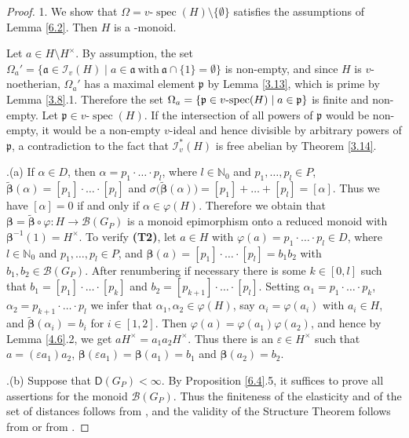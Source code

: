 \documentclass[a4paper]{amsart}
\theoremstyle{definition}
\numberwithin{equation}{section}
\begin{document}
\begin{proof}
1. We show that $\Omega = v$-$\operatorname{spec} (H) \setminus \{\emptyset\}$
satisfies the assumptions of Lemma \ref{6.2}. Then $H$ is a
{}-monoid.

Let $a \in H \setminus H^{\times}$. By assumption, the set
$\Omega_a' = \{ \mathfrak a \in \mathcal I_v(H) \mid a \in \mathfrak
a \ \text{with} \ \mathfrak a \cap \{1\} = \emptyset\}$ is
non-empty, and  since $H$ is $v$-noetherian, $\Omega_a'$ has a
maximal element $\mathfrak p$ by Lemma \ref{3.13}, which is prime by
Lemma \ref{3.8}.1. Therefore the set $\Omega_a = \{ \mathfrak p \in
v\text{\rm -spec}(H) \mid a \in \mathfrak p\}$ is finite and
non-empty. Let $\mathfrak p \in v$-$\operatorname{spec} (H)$. If the intersection
of all powers of $\mathfrak p$ would be non-empty, it would be a
non-empty $v$-ideal and hence divisible by arbitrary powers of
$\mathfrak p$, a contradiction to the fact that $\mathcal I_v^* (H)$
is free abelian by Theorem \ref{3.14}.

.(a) If $\alpha \in D$, then $\alpha = p_1 \cdot \ldots \cdot p_l$,
where $l \in \mathbb N_0$ and $p_1, \ldots, p_l \in P$,
$\widetilde{\boldsymbol \beta} (\alpha) = [p_1] \cdot \ldots \cdot
[p_l]$ and $\sigma \big( \widetilde{\boldsymbol \beta} (\alpha)
\big) = [p_1] + \ldots + [p_l] = [\alpha]$. Thus we have $[\alpha] =
0$ if and only if $\alpha \in \varphi (H)$. Therefore we obtain that
$\boldsymbol \beta = \widetilde{\boldsymbol \beta} \circ \varphi
\colon H \to \mathcal B (G_P)$ is a monoid epimorphism onto a
reduced monoid with $\boldsymbol \beta^{-1} (1) = H^{\times}$. To
verify {\bf (T2)}, let $a \in H$ with $\varphi (a) = p_1 \cdot
\ldots \cdot p_l \in D$, where $l \in \mathbb N_0$ and $p_1, \ldots,
p_l \in P$, and $\boldsymbol \beta (a) = [p_1] \cdot \ldots \cdot
[p_l] = b_1b_2$ with $b_1, b_2 \in \mathcal B (G_P)$. After
renumbering if necessary there is some $k \in [0, l]$ such that $b_1
= [p_1] \cdot \ldots \cdot [p_k]$ and $b_2 = [p_{k+1}] \cdot \ldots
\cdot [p_l]$. Setting $\alpha_1 = p_1 \cdot \ldots \cdot p_k$,
$\alpha_2 = p_{k+1} \cdot \ldots \cdot p_l$ we infer that $\alpha_1,
\alpha_2 \in \varphi (H)$, say $\alpha_i = \varphi (a_i)$ with $a_i
\in H$, and $\widetilde{\boldsymbol \beta} (\alpha_i) = b_i$ for $i
\in [1, 2]$. Then $\varphi (a) = \varphi (a_1)\varphi (a_2)$, and
hence by Lemma \ref{4.6}.2, we get $aH^{\times} = a_1 a_2
H^{\times}$. Thus there is an $\varepsilon \in H^{\times}$ such that
$a = (\varepsilon a_1)a_2$, $\boldsymbol \beta (\varepsilon a_1) =
\boldsymbol \beta (a_1) = b_1$ and $\boldsymbol \beta (a_2) = b_2$.

.(b) Suppose that $\mathsf D (G_P) < \infty$. By Proposition
\ref{6.4}.5, it suffices to prove all assertions for the monoid
$\mathcal B (G_P)$. Thus the finiteness of the elasticity and of the
set of distances follows from \cite[Theorem 3.4.11]{Ge-HK06a}, and
the validity of the Structure Theorem follows from \cite[Theorem
5.1]{Ge-Ka10a} or from \cite[Theorem 4.4]{Ge-Gr09b}.
\end{proof}
\end{document}
